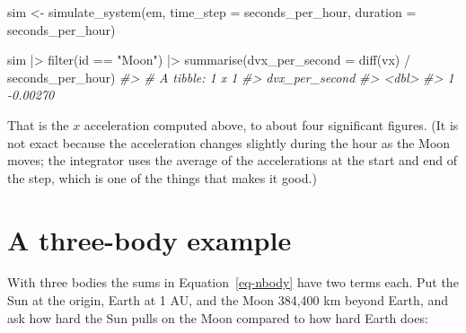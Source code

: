 \documentclass[
  10.5pt,
  letterpaper,
]{scrbook}
\newenvironment{Shaded}{\begin{snugshade}}{\end{snugshade}}
\newcommand{\AttributeTok}[1]{\textcolor[rgb]{0.00,0.00,0.00}{#1}}
\newcommand{\CommentTok}[1]{\textcolor[rgb]{0.00,0.00,0.00}{\textit{#1}}}
\newcommand{\FunctionTok}[1]{\textcolor[rgb]{0.00,0.00,0.00}{#1}}
\newcommand{\NormalTok}[1]{\textcolor[rgb]{0.00,0.00,0.00}{#1}}
\newcommand{\OtherTok}[1]{\textcolor[rgb]{0.00,0.00,0.00}{#1}}
\newcommand{\SpecialCharTok}[1]{\textcolor[rgb]{0.00,0.00,0.00}{#1}}
\newcommand{\StringTok}[1]{\textcolor[rgb]{0.00,0.00,0.00}{#1}}
\theoremstyle{definition}
\theoremstyle{plain}
\theoremstyle{remark}
\begin{document}
\begin{Shaded}
\begin{Highlighting}[]
\NormalTok{sim }\OtherTok{\textless{}{-}} \FunctionTok{simulate\_system}\NormalTok{(em, }\AttributeTok{time\_step =}\NormalTok{ seconds\_per\_hour,}
                       \AttributeTok{duration =}\NormalTok{ seconds\_per\_hour)}

\NormalTok{sim }\SpecialCharTok{|\textgreater{}}
  \FunctionTok{filter}\NormalTok{(id }\SpecialCharTok{==} \StringTok{"Moon"}\NormalTok{) }\SpecialCharTok{|\textgreater{}}
  \FunctionTok{summarise}\NormalTok{(}\AttributeTok{dvx\_per\_second =} \FunctionTok{diff}\NormalTok{(vx) }\SpecialCharTok{/}\NormalTok{ seconds\_per\_hour)}
\CommentTok{\#\textgreater{} \# A tibble: 1 x 1}
\CommentTok{\#\textgreater{}   dvx\_per\_second}
\CommentTok{\#\textgreater{}            \textless{}dbl\textgreater{}}
\CommentTok{\#\textgreater{} 1       {-}0.00270}
\end{Highlighting}
\end{Shaded}

That is the \(x\) acceleration computed above, to about four significant
figures. (It is not exact because the acceleration changes slightly
during the hour as the Moon moves; the integrator uses the average of
the accelerations at the start and end of the step, which is one of the
things that makes it good.)

\section{A three-body example}\label{a-three-body-example}

With three bodies the sums in Equation~\ref{eq-nbody} have two terms
each. Put the Sun at the origin, Earth at 1 AU, and the Moon 384,400 km
beyond Earth, and ask how hard the Sun pulls on the Moon compared to how
hard Earth does:
\end{document}
